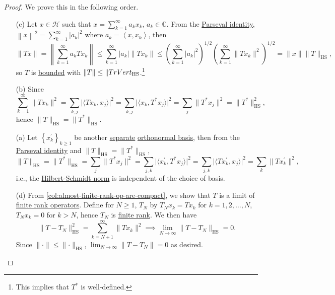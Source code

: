 \begin{proof}
	We prove this in the following order.
	\begin{enumerate}
		\item[(c)] Let \(x\in \mathcal{H} \) such that \(x = \sum_{k=1}^{\infty} a_{k} x_{k} \), \(a_{k} \in \mathbb{C} \). From the \hyperref[col:Parseval]{Parseval identity}, \(\left\lVert x\right\rVert ^{2} = \sum_{k=1}^{\infty}\left\vert a_{k}  \right\vert ^{2} \) where \(a_{k} = \left\langle x, x_{k}  \right\rangle \), then
			\[
				\lVert Tx \rVert
				= \left\lVert \sum_{k=1}^{\infty} a_{k} Tx_{k} \right\rVert
				\leq \sum_{k=1}^{\infty} \vert a_{k} \vert \lVert T x_{k} \rVert
				\leq \left( \sum_{k=1}^{\infty} \vert a_{k} \vert ^2 \right) ^{1 / 2} \left( \sum_{k=1}^{\infty} \lVert T x_{k} \rVert ^{2} \right) ^{1 / 2}
				= \lVert x \rVert \lVert T \rVert _{\mathrm{HS}},
			\]
			so \(T\) is \hyperref[def:bounded-linear-op]{bounded} with \(\lVert T \rVert \leq \lVert T\\rVert _{\mathrm{HS} }\).\footnote{This implies that \(T^{\ast} \) is well-defined.}
		\item[(b)] Since
			\[
				\sum_{k=1}^{\infty} \lVert Tx_{k} \rVert ^{2}
				= \sum_{k, j} \vert \langle  T x_{k} , x_{j} \rangle \vert ^{2}
				= \sum_{k, j} \vert \langle x_{k} , T^{\ast} x_{j} \rangle \vert ^{2}
				= \sum_{j} \lVert T^{\ast} x_{j} \rVert ^{2}
				= \lVert T^{\ast} \rVert ^{2} _{\mathrm{HS} },
			\]
			hence \(\lVert T\rVert _{\mathrm{HS} } = \lVert T^{\ast} \rVert _{\mathrm{HS} }\).
		\item[(a)] Let \(\left\{ x^\prime _k \right\}_{k\geq 1} \) be another \hyperref[def:separable]{separate} \hyperref[def:orthonormal-basis]{orthonormal basis}, then from the \hyperref[col:Parseval]{Parseval identity} and \(\lVert T \rVert _{\mathrm{HS} }= \lVert T^{\ast}  \rVert_{\mathrm{HS}}\),
			\[
				\lVert T \rVert _{\mathrm{HS} }
				= \lVert T^{\ast}  \rVert_{\mathrm{HS} }
				= \sum_{j} \lVert T^{\ast} x_{j} \rVert ^{2}
				= \sum_{j, k} \vert \langle x^\prime _{k} , T^{\ast} x_{j} \rangle \vert ^{2}
				= \sum_{j, k} \vert \langle T x^\prime _{k} , x_{j} \rangle \vert ^{2}
				= \sum_{k} \lVert T x^\prime _{k} \rVert ^{2},
			\]
			i.e., the \hyperref[def:Hilbert-Schmidt-norm]{Hilbert-Schmidt norm} is independent of the choice of basis.
		\item[(d)] From \autoref{col:almost-finite-rank-op-are-compact}, we show that \(T\) is a limit of \hyperref[rmk:finite-rank-op]{finite rank operators}. Define for \(N \geq 1\), \(T_N\) by \(T_N x_k = Tx_k\) for \(k = 1, 2, \ldots  , N\), \(T_{N}x_k = 0 \) for \(k > N\), hence \(T_N\) is \hyperref[rmk:finite-rank-op]{finite rank}. We then have
			\[
				\lVert T - T_{N} \rVert ^{2} _{\mathrm{HS} }
				= \sum_{k=N+1}^{\infty} \lVert T x_{k} \rVert ^{2}
				\implies \lim_{N \to \infty} \lVert T - T_{N} \rVert _{\mathrm{HS} } = 0.
			\]
			Since \(\lVert \cdot \rVert \leq \lVert \cdot \rVert _{\mathrm{HS} }\), \(\lim_{N \to \infty} \lVert T - T_N\rVert = 0\) as desired.
	\end{enumerate}
\end{proof}

